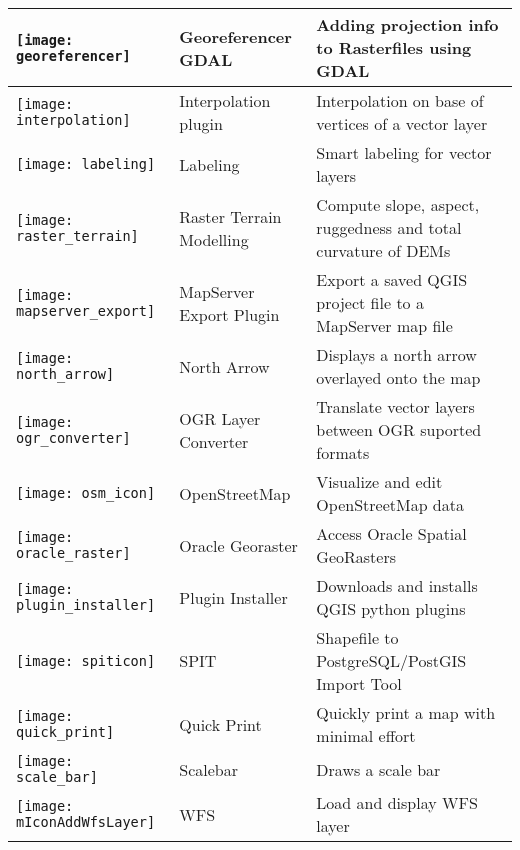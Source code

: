 \begin{minipage}{\textwidth}
\begin{table}[H]
\begin{tabular}{|l|l|p{4in}|}
\hline
\texttt{[image: georeferencer]}
 & Georeferencer GDAL \index{plugin!georeferencer} & Adding projection info to Rasterfiles using GDAL\\
\hline
\texttt{[image: interpolation]}
& Interpolation plugin \index{plugins!Interpolation}& Interpolation on base of vertices of a vector layer\\
\hline
\texttt{[image: labeling]}
& Labeling \index{plugins!Labeling}& Smart labeling for vector layers\\
\hline
\texttt{[image: raster\_terrain]}
& Raster Terrain Modelling \index{plugins!Raster Terrain Modelling}& Compute slope, aspect,
ruggedness and total curvature of DEMs\\
\hline
\texttt{[image: mapserver\_export]}
& MapServer Export Plugin \index{plugins!MapServer Export}& Export a saved QGIS project file to a MapServer map file \\
\hline
\texttt{[image: north\_arrow]}
& North Arrow \index{plugins!north arrow}& Displays a north arrow overlayed onto the map\\
\hline
\texttt{[image: ogr\_converter]}
 & OGR Layer Converter \index{plugins!OGR converter} & Translate vector
layers between OGR suported formats\\
\hline
\texttt{[image: osm\_icon]}
 & OpenStreetMap & Visualize and edit OpenStreetMap data \\
\hline
\texttt{[image: oracle\_raster]}
 & Oracle Georaster \index{plugins!georaster}& Access Oracle Spatial GeoRasters\\
\hline
\texttt{[image: plugin\_installer]}
 & Plugin Installer \index{plugins!Plugin Installer} & Downloads and installs QGIS python plugins\\
\hline
\texttt{[image: spiticon]}
 & SPIT \index{plugins!spit}& Shapefile to PostgreSQL/PostGIS Import Tool \\
\hline
\texttt{[image: quick\_print]}
 & Quick Print \index{plugins!quick print}& Quickly print a map with minimal
effort \\
\hline
\texttt{[image: scale\_bar]}
 & Scalebar \index{plugins!scalebar}& Draws a scale bar\\
\hline
\texttt{[image: mIconAddWfsLayer]}
 & WFS & Load and display WFS layer \\
\hline
\end{tabular}
\end{table}
\end{minipage}

\normalsize
